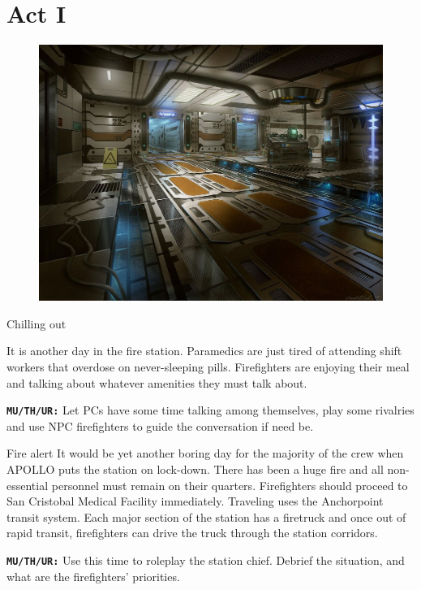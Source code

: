 \chapter{Act I}



\begin{figure}
    \centering
    \includegraphics[width=.45\textwidth]{img/bg/interior.jpg}
\end{figure}



\begin{rpg-commentbox}{Chilling out}

    It is another day in the fire station. Paramedics are just tired of attending shift workers that overdose on never-sleeping pills. Firefighters are enjoying their meal and talking about whatever amenities they must talk about.

    \texttt{\textbf{MU/TH/UR:}} Let PCs have some time talking among themselves, play some rivalries and use NPC firefighters to guide the conversation if need be.
\end{rpg-commentbox}

\newsect

\begin{rpg-commentbox}{Fire alert}
    It would be yet another boring day for the majority of the crew when APOLLO puts the station on lock-down. There has been a huge fire and all non-essential personnel must remain on their quarters. Firefighters should proceed to San Cristobal Medical Facility immediately. 
    Traveling uses the Anchorpoint transit system. Each major section of the station has a firetruck and once out of rapid transit, firefighters can drive the truck through the station corridors. 

    \texttt{\textbf{MU/TH/UR:}} Use this time to roleplay the station chief. Debrief the situation, and what are the firefighters' priorities.
\end{rpg-commentbox}


